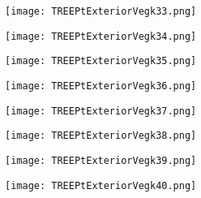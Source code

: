 \documentclass[pdf]{beamer}
\begin{document}
\begin{frame}
\begin{figure}[!h]
\centering
\texttt{[image: TREEPtExteriorVegk33.png]}
\end{figure}
\end{frame}

\begin{frame}
\begin{figure}[!h]
\centering
\texttt{[image: TREEPtExteriorVegk34.png]}
\end{figure}
\end{frame}

\begin{frame}
\begin{figure}[!h]
\centering
\texttt{[image: TREEPtExteriorVegk35.png]}
\end{figure}
\end{frame}

\begin{frame}
\begin{figure}[!h]
\centering
\texttt{[image: TREEPtExteriorVegk36.png]}
\end{figure}
\end{frame}

\begin{frame}
\begin{figure}[!h]
\centering
\texttt{[image: TREEPtExteriorVegk37.png]}
\end{figure}
\end{frame}

\begin{frame}
\begin{figure}[!h]
\centering
\texttt{[image: TREEPtExteriorVegk38.png]}
\end{figure}
\end{frame}

\begin{frame}
\begin{figure}[!h]
\centering
\texttt{[image: TREEPtExteriorVegk39.png]}
\end{figure}
\end{frame}

\begin{frame}
\begin{figure}[!h]
\centering
\texttt{[image: TREEPtExteriorVegk40.png]}
\end{figure}
\end{frame}
\end{document}
